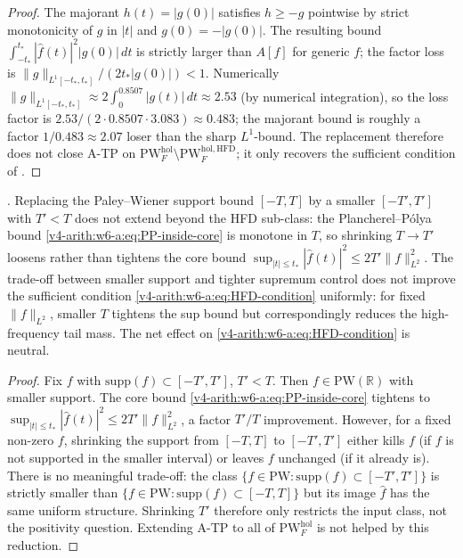 \begin{proof}
The majorant \(h(t)=|g(0)|\) satisfies \(h\geq-g\) pointwise by
strict monotonicity of \(g\) in \(|t|\) and \(g(0)=-|g(0)|\). The
resulting bound
\(\int_{-t_{\ast}}^{t_{\ast}}|\widehat{f}(t)|^{2}|g(0)|\,dt\) is
strictly larger than \(A[f]\) for generic \(f\); the factor loss is
\(\|g\|_{L^{1}[-t_{\ast},t_{\ast}]}/(2t_{\ast}|g(0)|)<1\). Numerically
\(\|g\|_{L^{1}[-t_{\ast},t_{\ast}]}\approx 2\int_{0}^{0.8507}|g(t)|\,dt\approx
2.53\) (by numerical integration), so the loss factor is
\(2.53/(2\cdot 0.8507\cdot 3.083)\approx 0.483\); the majorant bound is
roughly a factor \(1/0.483\approx 2.07\) loser than the sharp
\(L^{1}\)-bound. The replacement therefore does not close A-TP on
\(\mathrm{PW}^{\mathrm{hol}}_{F}\setminus\mathrm{PW}^{\mathrm{hol},\mathrm{HFD}}_{F}\);
it only recovers the sufficient condition of
.
\end{proof}

\begin{proposition}
\label{v4-arith:w6-a:prop:rule-out-pw-shrinkage}
\ClaimStatusProvedHere. Replacing the Paley--Wiener support bound
\([-T,T]\) by a smaller \([-T',T']\) with \(T'<T\) does not extend
 beyond the HFD sub-class: the
Plancherel--P\'olya bound
\eqref{v4-arith:w6-a:eq:PP-inside-core} is monotone in \(T\), so
shrinking \(T\to T'\) loosens rather than tightens the core bound
\(\sup_{|t|\leq t_{\ast}}|\widehat{f}(t)|^{2}\leq 2T'\|f\|_{L^{2}}^{2}\).
The trade-off between smaller support and tighter supremum control
does not improve the sufficient condition
\eqref{v4-arith:w6-a:eq:HFD-condition} uniformly: for fixed
\(\|f\|_{L^{2}}\), smaller \(T\) tightens the sup bound but
correspondingly reduces the high-frequency tail mass. The net effect
on \eqref{v4-arith:w6-a:eq:HFD-condition} is neutral.
\end{proposition}

\begin{proof}
Fix \(f\) with \(\mathrm{supp}(f)\subset[-T',T']\), \(T'<T\). Then
\(f\in\mathrm{PW}(\mathbb{R})\) with smaller support. The core bound
\eqref{v4-arith:w6-a:eq:PP-inside-core} tightens to
\(\sup_{|t|\leq t_{\ast}}|\widehat{f}(t)|^{2}\leq 2T'\|f\|_{L^{2}}^{2}\),
a factor \(T'/T\) improvement. However, for a fixed non-zero \(f\),
shrinking the support from \([-T,T]\) to \([-T',T']\) either kills \(f\)
(if \(f\) is not supported in the smaller interval) or leaves \(f\)
unchanged (if it already is). There is no meaningful trade-off: the
class \(\{f\in\mathrm{PW}:\mathrm{supp}(f)\subset[-T',T']\}\) is
strictly smaller than \(\{f\in\mathrm{PW}:\mathrm{supp}(f)\subset[-T,T]\}\)
but its image \(\widehat{f}\) has the same uniform structure.
Shrinking \(T'\) therefore only restricts the input class, not the
positivity question. Extending A-TP to all of
\(\mathrm{PW}^{\mathrm{hol}}_{F}\) is not helped by this reduction.
\end{proof}

